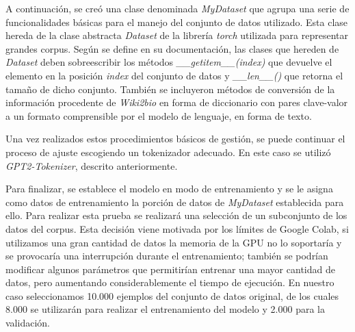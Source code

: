 A continuación, se creó una clase denominada \textit{MyDataset} que agrupa una serie de funcionalidades básicas para el manejo del conjunto de datos utilizado. Esta clase hereda de la clase abstracta \textit{Dataset} de la librería \textit{torch} utilizada para representar grandes corpus. Según se define en su documentación, las clases que hereden de \textit{Dataset} deben sobreescribir los métodos \textit{\_\_getitem\_\_(index)} que devuelve el elemento en la posición \textit{index} del conjunto de datos y \textit{\_\_len\_\_()} que retorna el tamaño de dicho conjunto. También se incluyeron métodos de conversión de la información procedente de \textit{Wiki2bio} en forma de diccionario con pares clave-valor a un formato comprensible por el modelo de lenguaje, en forma de texto.

Una vez realizados estos procedimientos básicos de gestión, se puede continuar el proceso de ajuste escogiendo un tokenizador adecuado. En este caso se utilizó \textit{GPT2-Tokenizer}, descrito anteriormente.

Para finalizar, se establece el modelo en modo de entrenamiento y se le asigna como datos de entrenamiento la porción de datos de \textit{MyDataset} establecida para ello. Para realizar esta prueba se realizará una selección de un subconjunto de los datos del corpus. Esta decisión viene motivada por los límites de Google Colab, si utilizamos una gran cantidad de datos la memoria de la GPU no lo soportaría y se provocaría una interrupción durante el entrenamiento; también se podrían modificar algunos parámetros que permitirían entrenar una mayor cantidad de datos, pero aumentando considerablemente el tiempo de ejecución. En nuestro caso seleccionamos 10.000 ejemplos del conjunto de datos original, de los cuales 8.000 se utilizarán para realizar el entrenamiento del modelo y 2.000 para la validación.

